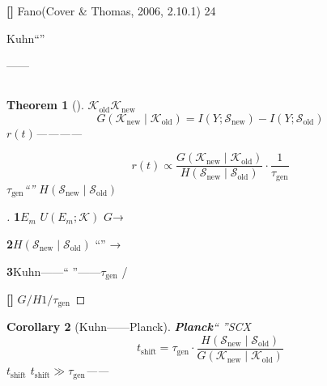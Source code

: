 \documentclass[11pt,a4paper]{article}
\newtheorem{theorem}{Theorem}[section]
\newtheorem{corollary}[theorem]{Corollary}
\theoremstyle{remark}
\newcommand{\rigorous}{\textnormal{\textbf{[]}}}
\newcommand{\heuristic}{\textnormal{\textbf{[]}}}
\begin{document}
\rigorous{} \textbf{}Fano(Cover \& Thomas, 2006, 2.10.1)
24

\textbf{}Kuhn``''

——


\subsection{}

\begin{theorem}[]
\label{thm:paradigm_shift_dynamics}
$\mathcal{K}_{\text{old}}$$\mathcal{K}_{\text{new}}$
\textbf{}
\begin{equation}
    \boxed{G(\mathcal{K}_{\text{new}} \mid \mathcal{K}_{\text{old}})
    = I(Y; \mathcal{S}_{\text{new}}) - I(Y; \mathcal{S}_{\text{old}})}
\end{equation}
\textbf{}$r(t)$————

\begin{equation}
    \boxed{r(t) \propto \frac{G(\mathcal{K}_{\text{new}} \mid \mathcal{K}_{\text{old}})}
                             {H(\mathcal{S}_{\text{new}} \mid \mathcal{S}_{\text{old}})} \cdot
                             \frac{1}{\tau_{\text{gen}}}}
\end{equation}
$\tau_{\text{gen}}$``''
$H(\mathcal{S}_{\text{new}} \mid \mathcal{S}_{\text{old}})$
\textbf{}
\end{theorem}

\begin{proof}[]
\textbf{1}$E_m$
$U(E_m; \mathcal{K})$
$G$→

\textbf{2}$H(\mathcal{S}_{\text{new}} \mid \mathcal{S}_{\text{old}})$
``''
→

\textbf{3}Kuhn——``
''——$\tau_{\text{gen}}$
/

\heuristic{} 
$G/H$$1/\tau_{\text{gen}}$

\end{proof}

\begin{corollary}[Kuhn——Planck]
\label{cor:planck}
\textbf{Planck}``
''SCX
\begin{equation}
    \boxed{t_{\text{shift}} = \tau_{\text{gen}} \cdot \frac{H(\mathcal{S}_{\text{new}} \mid \mathcal{S}_{\text{old}})}
                                               {G(\mathcal{K}_{\text{new}} \mid \mathcal{K}_{\text{old}})}}
\end{equation}
$t_{\text{shift}}$\textbf{}
$t_{\text{shift}} \gg \tau_{\text{gen}}$——

\end{corollary}
\end{document}
